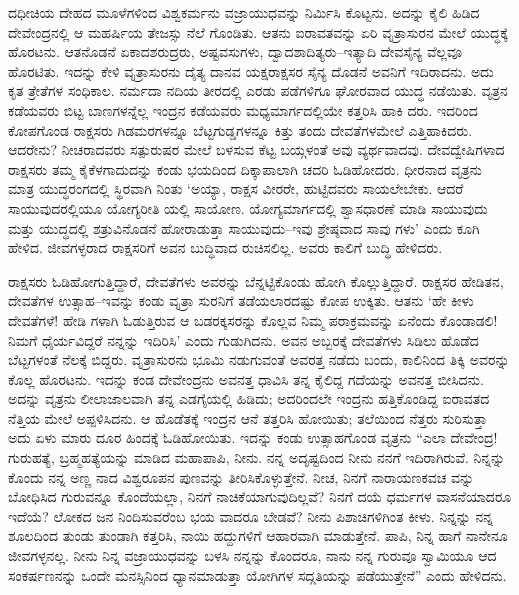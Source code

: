 ದಧೀಚಿಯ ದೇಹದ ಮೂಳೆಗಳಿಂದ ವಿಶ್ವಕರ್ಮನು ವಜ್ರಾಯುಧವನ್ನು ನಿರ್ಮಿಸಿ ಕೊಟ್ಟನು. ಅದನ್ನು ಕೈಲಿ ಹಿಡಿದ ದೇವೇಂದ್ರನಲ್ಲಿ ಆ ಮಹರ್ಷಿಯ ತೇಜಸ್ಸು ನೆಲೆ ಗೊಂಡಿತು. ಆತನು ಐರಾವತವನ್ನು ಏರಿ ವೃತ್ರಾಸುರನ ಮೇಲೆ ಯುದ್ಧಕ್ಕೆ ಹೊರಟನು. ಆತನೊಡನೆ ಏಕಾದಶರುದ್ರರು, ಅಷ್ಟವಸುಗಳು, ದ್ವಾದಶಾದಿತ್ಯರು–ಇತ್ಯಾದಿ ದೇವಸೈನ್ಯ ವೆಲ್ಲವೂ ಹೊರಟಿತು. ಇದನ್ನು ಕೇಳಿ ವೃತ್ರಾಸುರನು ದೈತ್ಯ ದಾನವ ಯಕ್ಷರಾಕ್ಷಸರ ಸೈನ್ಯ ದೊಡನೆ ಅವನಿಗೆ ಇದಿರಾದನು. ಅದು ಕೃತ ತ್ರೇತೆಗಳ ಸಂಧಿಕಾಲ. ನರ್ಮದಾ ನದಿಯ ತೀರದಲ್ಲಿ ಎರಡು ಪಡೆಗಳಿಗೂ ಘೋರವಾದ ಯುದ್ಧ ನಡೆಯಿತು. ವೃತ್ರನ ಕಡೆಯವರು ಬಿಟ್ಟ ಬಾಣಗಳನ್ನೆಲ್ಲ ಇಂದ್ರನ ಕಡೆಯವರು ಮಧ್ಯಮಾರ್ಗದಲ್ಲಿಯೇ ಕತ್ತರಿಸಿ ಹಾಕಿ ದರು. ಇದರಿಂದ ಕೋಪಗೊಂಡ ರಾಕ್ಷಸರು ಗಿಡಮರಗಳನ್ನೂ ಬೆಟ್ಟಗುಡ್ಡಗಳನ್ನೂ ಕಿತ್ತು ತಂದು ದೇವತೆಗಳಮೇಲೆ ಎತ್ತಿಹಾಕಿದರು. ಆದರೇನು? ನೀಚರಾದವರು ಸತ್ಪುರುಷರ ಮೇಲೆ ಬಳಸುವ ಕೆಟ್ಟ ಬಯ್ಗಳಂತೆ ಅವು ವ್ಯರ್ಥವಾದವು. ದೇವದ್ವೇಷಿಗಳಾದ ರಾಕ್ಷಸರು ತಮ್ಮ ಕೈಕೆಳಗಾದುದನ್ನು ಕಂಡು ಭಯದಿಂದ ದಿಕ್ಕಾಪಾಲಾಗಿ ಚದರಿ ಓಡಿಹೋದರು. ಧೀರನಾದ ವೃತ್ರನು ಮಾತ್ರ ಯುದ್ಧರಂಗದಲ್ಲಿ ಸ್ಥಿರವಾಗಿ ನಿಂತು ‘ಅಯ್ಯಾ, ರಾಕ್ಷಸ ವೀರರೇ, ಹುಟ್ಟಿದವರು ಸಾಯಲೇಬೇಕು. ಆದರೆ ಸಾಯುವುದರಲ್ಲಿಯೂ ಯೋಗ್ಯರೀತಿ ಯಲ್ಲಿ ಸಾಯೋಣ. ಯೋಗ್ಯಮಾರ್ಗದಲ್ಲಿ ಶ್ವಾಸಧಾರಣೆ ಮಾಡಿ ಸಾಯುವುದು ಮತ್ತು ಯುದ್ಧದಲ್ಲಿ ಶತ್ರುವಿನೊಡನೆ ಹೋರಾಡುತ್ತಾ ಸಾಯುವುದು–ಇವು ಶ್ರೇಷ್ಠವಾದ ಸಾವು ಗಳು’ ಎಂದು ಕೂಗಿ ಹೇಳಿದ. ಜೀವಗಳ್ಳರಾದ ರಾಕ್ಷಸರಿಗೆ ಅವನ ಬುದ್ಧಿವಾದ ರುಚಿಸಲಿಲ್ಲ. ಅವರು ಕಾಲಿಗೆ ಬುದ್ಧಿ ಹೇಳಿದರು.

ರಾಕ್ಷಸರು ಓಡಿಹೋಗುತ್ತಿದ್ದಾರೆ, ದೇವತೆಗಳು ಅವರನ್ನು ಬೆನ್ನಟ್ಟಿಕೊಂಡು ಹೋಗಿ ಕೊಲ್ಲುತ್ತಿದ್ದಾರೆ. ರಾಕ್ಷಸರ ಹೇಡಿತನ, ದೇವತೆಗಳ ಉತ್ಸಾಹ–ಇವನ್ನು ಕಂಡು ವೃತ್ರಾ ಸುರನಿಗೆ ತಡೆಯಲಾರದಷ್ಟು ಕೋಪ ಉಕ್ಕಿತು. ಆತನು ‘ಹೇ ಕೀಳು ದೇವತೆಗಳೆ! ಹೇಡಿ ಗಳಾಗಿ ಓಡುತ್ತಿರುವ ಆ ಬಡರಕ್ಕಸರನ್ನು ಕೊಲ್ಲವ ನಿಮ್ಮ ಪರಾಕ್ರಮವನ್ನು ಏನೆಂದು ಕೊಂಡಾಡಲಿ! ನಿಮಗೆ ಧೈರ್ಯವಿದ್ದರೆ ನನ್ನನ್ನು ಇದಿರಿಸಿ’ ಎಂದು ಗುಡುಗಿದನು. ಅವನ ಅಬ್ಬರಕ್ಕೆ ದೇವತೆಗಳು ಸಿಡಿಲು ಹೊಡೆದ ಬೆಟ್ಟಗಳಂತೆ ನೆಲಕ್ಕೆ ಬಿದ್ದರು. ವೃತ್ರಾಸುರನು ಭೂಮಿ ನಡುಗುವಂತೆ ಅವರತ್ತ ನಡೆದು ಬಂದು, ಕಾಲಿನಿಂದ ತಿಕ್ಕಿ ಅವರನ್ನು ಕೊಲ್ಲ ಹೊರಟನು. ಇದನ್ನು ಕಂಡ ದೇವೇಂದ್ರನು ಅವನತ್ತ ಧಾವಿಸಿ ತನ್ನ ಕೈಲಿದ್ದ ಗದೆಯನ್ನು ಅವನತ್ತ ಬೀಸಿದನು. ಅದನ್ನು ವೃತ್ರನು ಲೀಲಾಜಾಲವಾಗಿ ತನ್ನ ಎಡಗೈಯಲ್ಲಿ ಹಿಡಿದು; ಅದರಿಂದಲೇ ಇಂದ್ರನು ಹತ್ತಿಕೊಂಡಿದ್ದ ಐರಾವತದ ನೆತ್ತಿಯ ಮೇಲೆ ಅಪ್ಪಳಿಸಿದನು. ಆ ಹೊಡೆತಕ್ಕೆ ಇಂದ್ರನ ಆನೆ ತತ್ತರಿಸಿ ಹೋಯಿತು; ತಲೆಯಿಂದ ನೆತ್ತರು ಸುರಿಸುತ್ತಾ ಅದು ಏಳು ಮಾರು ದೂರ ಹಿಂದಕ್ಕೆ ಓಡಿಹೋಯಿತು. ಇದನ್ನು ಕಂಡು ಉತ್ಸಾಹಗೊಂಡ ವೃತ್ರನು “ಎಲಾ ದೇವೇಂದ್ರ! ಗುರುಹತ್ಯೆ, ಬ್ರಹ್ಮಹತ್ಯೆಯನ್ನು ಮಾಡಿದ ಮಹಾಪಾಪಿ, ನೀನು. ನನ್ನ ಅದೃಷ್ಟದಿಂದ ನೀನು ನನಗೆ ಇದಿರಾಗಿರುವೆ. ನಿನ್ನನ್ನು ಕೊಂದು ನನ್ನ ಅಣ್ಣ ನಾದ ವಿಶ್ವರೂಪನ ಪುಣವನ್ನು ತೀರಿಸಿಕೊಳ್ಳುತ್ತೇನೆ. ನೀಚ, ನಿನಗೆ ನಾರಾಯಣಕವಚ ವನ್ನು ಬೋಧಿಸಿದ ಗುರುವನ್ನೂ ಕೊಂದೆಯಲ್ಲಾ, ನಿನಗೆ ನಾಚಿಕೆಯಾಗುವುದಿಲ್ಲವೆ? ನಿನಗೆ ದಯೆ ಧರ್ಮಗಳ ವಾಸನೆಯಾದರೂ ಇದೆಯೆ? ಲೋಕದ ಜನ ನಿಂದಿಸುವರೆಂಬ ಭಯ ವಾದರೂ ಬೇಡವೆ? ನೀನು ಪಿಶಾಚಿಗಳಿಗಿಂತ ಕೀಳು. ನಿನ್ನನ್ನು ನನ್ನ ಶೂಲದಿಂದ ತುಂಡು ತುಂಡಾಗಿ ಕತ್ತರಿಸಿ, ನಾಯಿ ಹದ್ದುಗಳಿಗೆ ಆಹಾರವಾಗಿ ಮಾಡುತ್ತೇನೆ. ಪಾಪಿ, ನಿನ್ನ ಹಾಗೆ ನಾನೇನೂ ಜೀವಗಳ್ಳನಲ್ಲ. ನೀನು ನಿನ್ನ ವಜ್ರಾಯುಧವನ್ನು ಬಳಸಿ ನನ್ನನ್ನು ಕೊಂದರೂ, ನಾನು ನನ್ನ ಗುರುವೂ ಸ್ವಾಮಿಯೂ ಆದ ಸಂಕರ್ಷಣನನ್ನು ಒಂದೇ ಮನಸ್ಸಿನಿಂದ ಧ್ಯಾನಮಾಡುತ್ತಾ ಯೋಗಿಗಳ ಸದ್ಗತಿಯನ್ನು ಪಡೆಯುತ್ತೇನೆ” ಎಂದು ಹೇಳಿದನು. 

